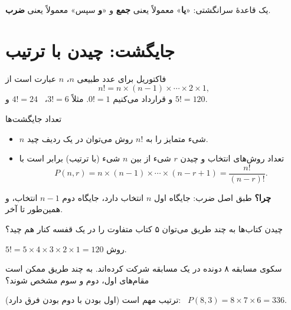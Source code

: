 \begin{note}
یک قاعدهٔ سرانگشتی: «\textbf{یا}» معمولاً یعنی \textbf{جمع} و «\textbf{و} سپس» معمولاً یعنی \textbf{ضرب}.
\end{note}

\section{جایگشت: چیدن با ترتیب}

\begin{definition}[label=hs:def:factorial]{فاکتوریل}
برای عدد طبیعی $n$،  $n$ عبارت است از
\[ n!=n\times(n-1)\times\cdots\times2\times1, \]
و قرارداد می‌کنیم $0!=1$. مثلاً $3!=6$، \ $4!=24$ و $5!=120$.
\end{definition}

\begin{theorem}[label=hs:thm:perm]{تعداد جایگشت‌ها}
\begin{itemize}
  \item $n$ شیء متمایز را به $n!$ روش می‌توان در یک ردیف چید.
  \item تعداد روش‌های انتخاب و چیدن $r$ شیء از بین $n$ شیء (با ترتیب) برابر است با
  \[ P(n,r)=n\times(n-1)\times\cdots\times(n-r+1)=\frac{n!}{(n-r)!}. \]
\end{itemize}
\end{theorem}

\textbf{چرا؟} طبق اصل ضرب: جایگاه اول $n$ انتخاب دارد، جایگاه دوم $n-1$ انتخاب، و همین‌طور تا آخر.

\begin{example}[label=hs:ex:books]{چیدن کتاب‌ها}
به چند طریق می‌توان ۵ کتاب متفاوت را در یک قفسه کنار هم چید؟
\begin{solution}
$5!=5\times4\times3\times2\times1=120$ روش.
\end{solution}
\end{example}

\begin{example}[label=hs:ex:podium]{سکوی مسابقه}
۸ دونده در یک مسابقه شرکت کرده‌اند. به چند طریق ممکن است مقام‌های اول، دوم و سوم مشخص شوند؟
\begin{solution}
ترتیب مهم است (اول بودن با دوم بودن فرق دارد): \ $P(8,3)=8\times7\times6=336$.
\end{solution}
\end{example}

